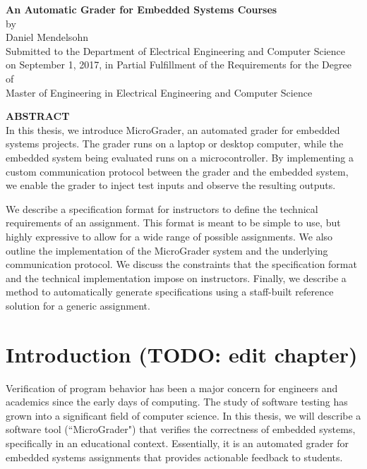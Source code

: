 \documentclass[12pt]{article}
\newcommand{\mytitle}{\textbf{An Automatic Grader for Embedded Systems Courses}}
\newcommand{\mydate}{September 1, 2017}
\begin{document}
\addtocounter{page}{1}

\newpage
\mbox{}
\newpage

\begin{center}
\mytitle \\
by \\
Daniel Mendelsohn \\
\vspace{12pt}
Submitted to the Department of Electrical Engineering and Computer Science\\
 on \mydate{}, in Partial Fulfillment of the Requirements for the Degree of\\
 Master of Engineering in Electrical Engineering and Computer Science
\end{center}
\vspace{12pt}
\textbf{ABSTRACT} \\

\noindent In this thesis, we introduce MicroGrader, an automated grader for embedded systems projects.  The grader runs on a laptop or desktop computer, while the embedded system being evaluated runs on a microcontroller.  By implementing a custom communication protocol between the grader and the embedded system, we enable the grader to inject test inputs and observe the resulting outputs.

We describe a specification format for instructors to define the technical requirements of an assignment.  This format is meant to be simple to use, but highly expressive to allow for a wide range of possible assignments.  We also outline the implementation of the MicroGrader system and the underlying communication protocol.  We discuss the constraints that the specification format and the technical implementation impose on instructors.  Finally, we describe a method to automatically generate specifications using a staff-built reference solution for a generic assignment. 

\newpage
\mbox{}
\newpage

\tableofcontents

\newpage
\listoffigures
\listoftables

\doublespacing

\newpage
\section{Introduction (TODO: edit chapter)}
Verification of program behavior has been a major concern for engineers and academics since the early days of computing.  The study of software testing has grown into a significant field of computer science.  In this thesis, we will describe a software tool (``MicroGrader") that verifies the correctness of embedded systems, specifically in an educational context.  Essentially, it is an automated grader for embedded systems assignments that provides actionable feedback to students.
\end{document}
